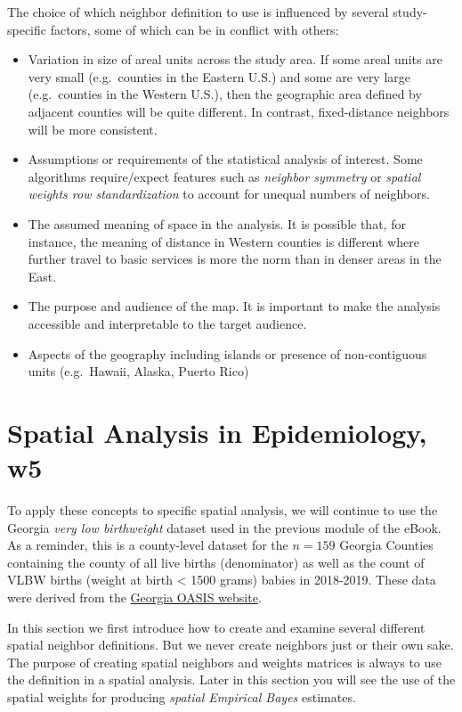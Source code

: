 \documentclass[
]{book}
\providecommand{\tightlist}{%
  \setlength{\itemsep}{0pt}\setlength{\parskip}{0pt}}
\begin{document}
The choice of which neighbor definition to use is influenced by several study-specific factors, some of which can be in conflict with others:

\begin{itemize}
\tightlist
\item
  Variation in size of areal units across the study area. If some areal units are very small (e.g.~counties in the Eastern U.S.) and some are very large (e.g.~counties in the Western U.S.), then the geographic area defined by adjacent counties will be quite different. In contrast, fixed-distance neighbors will be more consistent.
\item
  Assumptions or requirements of the statistical analysis of interest. Some algorithms require/expect features such as \emph{neighbor symmetry} or \emph{spatial weights row standardization} to account for unequal numbers of neighbors.
\item
  The assumed meaning of space in the analysis. It is possible that, for instance, the meaning of distance in Western counties is different where further travel to basic services is more the norm than in denser areas in the East.
\item
  The purpose and audience of the map. It is important to make the analysis accessible and interpretable to the target audience.
\item
  Aspects of the geography including islands or presence of non-contiguous units (e.g.~Hawaii, Alaska, Puerto Rico)
\end{itemize}

\hypertarget{spatial-analysis-in-epidemiology-w5}{%
\section{Spatial Analysis in Epidemiology, w5}\label{spatial-analysis-in-epidemiology-w5}}

To apply these concepts to specific spatial analysis, we will continue to use the Georgia \emph{very low birthweight} dataset used in the previous module of the eBook. As a reminder, this is a county-level dataset for the \(n=159\) Georgia Counties containing the county of all live births (denominator) as well as the count of VLBW births (weight at birth \textless{} 1500 grams) babies in 2018-2019. These data were derived from the \href{https://oasis.state.ga.us/}{Georgia OASIS website}.

In this section we first introduce how to create and examine several different spatial neighbor definitions. But we never create neighbors just or their own sake. The purpose of creating spatial neighbors and weights matrices is always to use the definition in a spatial analysis. Later in this section you will see the use of the spatial weights for producing \emph{spatial Empirical Bayes} estimates.
\end{document}
